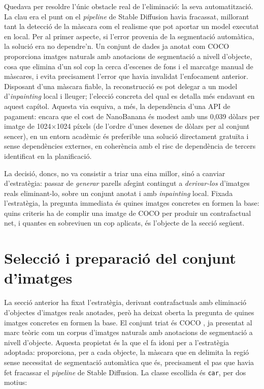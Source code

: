 Quedava per resoldre l'únic obstacle real de l'eliminació: la seva automatització. La clau era el punt on el \emph{pipeline} de Stable Diffusion havia fracassat, millorant tant la detecció de la màscara com el realisme que pot aportar un model executat en local. Per al primer aspecte, si l'error provenia de la segmentació automàtica, la solució era no dependre'n. Un conjunt de dades ja anotat com \ac{COCO} proporciona imatges naturals amb anotacions de segmentació a nivell d'objecte, cosa que elimina d'un sol cop la cerca d'escenes de fons i el marcatge manual de màscares, i evita precisament l'error que havia invalidat l'enfocament anterior. Disposant d'una màscara fiable, la reconstrucció es pot delegar a un model d'\emph{inpainting} local i lleuger; l'elecció concreta del qual es detalla més endavant en aquest capítol. Aquesta via esquiva, a més, la dependència d'una \ac{API} de pagament: encara que el cost de NanoBanana és modest amb uns 0,039 dòlars per imatge de 1024$\times$1024 píxels (de l'ordre d'unes desenes de dòlars per al conjunt sencer), en un entorn acadèmic és preferible una solució directament gratuïta i sense dependències externes, en coherència amb el risc de dependència de tercers identificat en la planificació.

La decisió, doncs, no va consistir a triar una eina millor, sinó a canviar d'estratègia: passar de \emph{generar} parells afegint contingut a \emph{derivar-los} d'imatges reals eliminant-lo, sobre un conjunt anotat i amb \emph{inpainting} local. Fixada l'estratègia, la pregunta immediata és quines imatges concretes en formen la base: quins criteris ha de complir una imatge de \ac{COCO} per produir un contrafactual net, i quantes en sobreviuen un cop aplicats, és l'objecte de la secció següent.

\section{Selecció i preparació del conjunt d'imatges}
La secció anterior ha fixat l'estratègia, derivant contrafactuals amb eliminació d'objectes d'imatges reals anotades, però ha deixat oberta la pregunta de quines imatges concretes en formen la base. El conjunt triat és \ac{COCO} \cite{Lin2014}, ja presentat al marc teòric com un corpus d'imatges naturals amb anotacions de segmentació a nivell d'objecte. Aquesta propietat és la que el fa idoni per a l'estratègia adoptada: proporciona, per a cada objecte, la màscara que en delimita la regió sense necessitat de segmentació automàtica que és, precisament el pas que havia fet fracassar el \emph{pipeline} de Stable Diffusion. La classe escollida és \texttt{car}, per dos motius:

